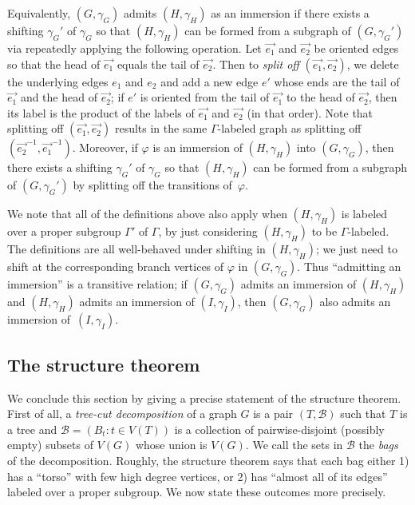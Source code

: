 \documentclass[11pt]{article}
\theoremstyle{definition}
\begin{document}
Equivalently, $(G, \gamma_G)$ admits $(H, \gamma_H)$ as an immersion if there exists a shifting $\gamma_G'$ of $\gamma_G$ so that $(H, \gamma_H)$ can be formed from a subgraph of $(G, \gamma_G')$ via repeatedly applying the following operation. Let $\vec{e_1}$ and $\vec{e_2}$ be oriented edges so that the head of $\vec{e_1}$ equals the tail of $\vec{e_2}$. Then to \emph{split off} $(\vec{e_1}, \vec{e_2})$, we delete the underlying edges $e_1$ and $e_2$ and add a new edge $e'$ whose ends are the tail of $\vec{e_1}$ and the head of $\vec{e_2}$; if $e'$ is oriented from the tail of $\vec{e_1}$ to the head of $\vec{e_2}$, then its label is the product of the labels of $\vec{e_1}$ and $\vec{e_2}$ (in that order). Note that splitting off $(\vec{e_1}, \vec{e_2})$ results in the same $\Gamma$-labeled graph as splitting off $(\vec{e_2}^{-1}, \vec{e_1}^{-1})$. Moreover, if $\varphi$ is an immersion of $(H, \gamma_H)$ into $(G, \gamma_G)$, then there exists a shifting $\gamma_G'$ of $\gamma_G$ so that $(H, \gamma_H)$ can be formed from a subgraph of $(G, \gamma_G')$ by splitting off the transitions of~$\varphi$.


We note that all of the definitions above also apply when $(H, \gamma_H)$ is labeled over a proper subgroup $\Gamma'$ of $\Gamma$, by just considering $(H, \gamma_H)$ to be $\Gamma$-labeled. The definitions are all well-behaved under shifting in $(H, \gamma_H)$; we just need to shift at the corresponding branch vertices of $\varphi$ in $(G, \gamma_G)$. Thus ``admitting an immersion'' is a transitive relation; if $(G, \gamma_G)$ admits an immersion of $(H, \gamma_H)$ and $(H, \gamma_H)$ admits an immersion of $(I, \gamma_I)$, then $(G, \gamma_G)$ also admits an immersion of~$(I, \gamma_I)$. 

\subsection{The structure theorem}
\label{subsec:structureThm}

We conclude this section by giving a precise statement of the structure theorem. First of all, a \textit{tree-cut decomposition} of a graph $G$ is a pair $(T, \mathscr{B})$ such that $T$ is a tree and $\mathscr{B} = (B_t : t \in V(T))$ is a collection of pairwise-disjoint (possibly empty) subsets of $V(G)$ whose union is $V(G)$. We call the sets in $\mathscr{B}$ the \textit{bags} of the decomposition. Roughly, the structure theorem says that each bag either 1) has a ``torso'' with few high degree vertices, or 2) has ``almost all of its edges'' labeled over a proper subgroup. We now state these outcomes more precisely.
\end{document}
